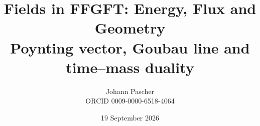 \documentclass[11pt,a4paper]{report}
\title{Fields in FFGFT: Energy, Flux and Geometry\\[0.5em]\large Poynting vector, Goubau line and time--mass duality}
\date{19 September 2026}
\author{Johann Pascher\\\small ORCID 0009-0000-6518-4064}
\begin{document}
\renewcommand{\thechapter}{}
\renewcommand{\thesection}{\arabic{section}}
\maketitle
\tableofcontents

\end{document}
